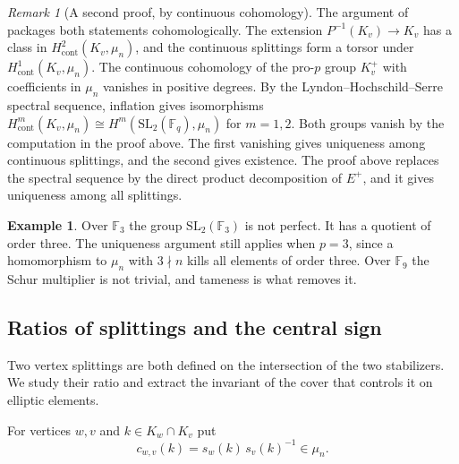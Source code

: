 \documentclass[12pt,letterpaper]{article}
\numberwithin{equation}{section}
\theoremstyle{definition}
\newtheorem{example}[theorem]{Example}
\theoremstyle{remark}
\newtheorem{remark}[theorem]{Remark}
\newcommand{\kk}{\mathbb F_q}
\begin{document}
\begin{remark}[A second proof, by continuous cohomology]\label{rem:cohomology}
The argument of \cite{Jo26a} packages both statements cohomologically. The extension $P^{-1}(K_v)\to K_v$ has a class in $H^2_{\mathrm{cont}}(K_v,\mu_n)$, and the continuous splittings form a torsor under $H^1_{\mathrm{cont}}(K_v,\mu_n)$. The continuous cohomology of the pro-$p$ group $K_v^+$ with coefficients in $\mu_n$ vanishes in positive degrees. By the Lyndon--Hochschild--Serre spectral sequence, inflation gives isomorphisms $H^m_{\mathrm{cont}}(K_v,\mu_n)\cong H^m(\mathrm{SL}_2(\kk),\mu_n)$ for $m=1,2$. Both groups vanish by the computation in the proof above. The first vanishing gives uniqueness among continuous splittings, and the second gives existence. The proof above replaces the spectral sequence by the direct product decomposition of $E^+$, and it gives uniqueness among all splittings.
\end{remark}

\begin{example}
Over $\mathbb F_3$ the group $\mathrm{SL}_2(\mathbb F_3)$ is not perfect. It has a quotient of order three. The uniqueness argument still applies when $p=3$, since a homomorphism to $\mu_n$ with $3\nmid n$ kills all elements of order three. Over $\mathbb F_9$ the Schur multiplier is not trivial, and tameness is what removes it.
\end{example}

\subsection*{Ratios of splittings and the central sign}
Two vertex splittings are both defined on the intersection of the two stabilizers. We study their ratio and extract the invariant of the cover that controls it on elliptic elements.

For vertices $w,v$ and $k\in K_w\cap K_v$ put
\begin{equation}\label{eq:cwv}
 c_{w,v}(k)=s_w(k)\,s_v(k)^{-1}\in\mu_n .
\end{equation}
\end{document}
